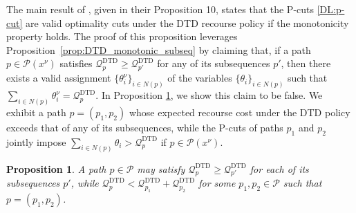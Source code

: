 \documentclass{article}
\newtheorem{proposition}{Proposition}
\newcommand{\rev}[1]{{\color{black}#1}}
\begin{document}
The main result of \cite{parada2024disaggregated}, given in their Proposition 10, states that the P-cuts \eqref{DL:p-cut} are valid optimality cuts under the DTD recourse policy if the monotonicity property holds. The proof of this proposition leverages Proposition~\ref{prop:DTD_monotonic_subseq} by claiming that, if a path $p \in \mathcal{P}(x^{\nu})$ satisfies $\mathcal{Q}^{\text{DTD}}_p \geq \mathcal{Q}^{\text{DTD}}_{p'}$ for any of its subsequences $p'$, then there exists a valid assignment $\{\theta_i^{\nu}\}_{i \in N(p)}$ of the variables $\{\theta_i\}_{i \in N(p)}$ such that $\sum_{i \in N(p)} \theta_i^{\nu} = \mathcal{Q}^{\text{DTD}}_p$. In Proposition \ref{prop:monotonicity_subsequence_not_sufficient}, we show this claim to be false. \rev{We exhibit a path $p=(p_1,p_2)$ whose expected recourse cost under the DTD policy exceeds that of any of its subsequences, while the P-cuts of paths $p_1$ and $p_2$ jointly impose $\sum_{i \in N(p)} \theta_i > \mathcal{Q}^{\text{DTD}}_{p}$ if $p \in \mathcal{P}(x^{\nu})$.}

\begin{proposition}\label{prop:monotonicity_subsequence_not_sufficient} A path $p \in \mathcal{P}$ may satisfy $\mathcal{Q}^{\text{DTD}}_p \geq \mathcal{Q}^{\text{DTD}}_{p'}$ for each of its subsequences $p'$, while $\mathcal{Q}^{\text{DTD}}_{p} < \mathcal{Q}^{\text{DTD}}_{p_1} + \mathcal{Q}^{\text{DTD}}_{p_2}$ for some $p_1, p_2 \in \mathcal{P}$ such that $p=(p_1,p_2)$.
\end{proposition}

\end{document}
